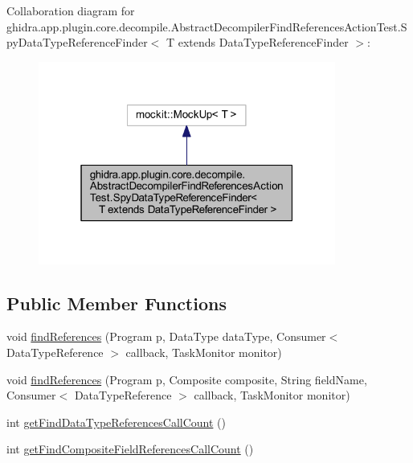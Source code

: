 Collaboration diagram for ghidra.\+app.\+plugin.\+core.\+decompile.\+Abstract\+Decompiler\+Find\+References\+Action\+Test.\+Spy\+Data\+Type\+Reference\+Finder$<$ T extends Data\+Type\+Reference\+Finder $>$\+:
\nopagebreak
\begin{figure}[H]
\begin{center}
\leavevmode
\includegraphics[width=277pt]{classghidra_1_1app_1_1plugin_1_1core_1_1decompile_1_1_abstract_decompiler_find_references_action73cb8965d3052dbece90fcf7f0187236}
\end{center}
\end{figure}
\subsection*{Public Member Functions}
\begin{DoxyCompactItemize}
\item 
void \mbox{\hyperlink{classghidra_1_1app_1_1plugin_1_1core_1_1decompile_1_1_abstract_decompiler_find_references_action62f1da74789936d35e783df474af1e76_a8fa9ec88d0356a00f85d672db38cdb70}{find\+References}} (Program p, Data\+Type data\+Type, Consumer$<$ Data\+Type\+Reference $>$ callback, Task\+Monitor monitor)
\item 
void \mbox{\hyperlink{classghidra_1_1app_1_1plugin_1_1core_1_1decompile_1_1_abstract_decompiler_find_references_action62f1da74789936d35e783df474af1e76_aafec778c5552ffcf7d9a44cf3b7acad1}{find\+References}} (Program p, Composite composite, String field\+Name, Consumer$<$ Data\+Type\+Reference $>$ callback, Task\+Monitor monitor)
\item 
int \mbox{\hyperlink{classghidra_1_1app_1_1plugin_1_1core_1_1decompile_1_1_abstract_decompiler_find_references_action62f1da74789936d35e783df474af1e76_ad645a281a9626bf9c6db823800363505}{get\+Find\+Data\+Type\+References\+Call\+Count}} ()
\item 
int \mbox{\hyperlink{classghidra_1_1app_1_1plugin_1_1core_1_1decompile_1_1_abstract_decompiler_find_references_action62f1da74789936d35e783df474af1e76_a58194323aae0608e642b48bd59db188f}{get\+Find\+Composite\+Field\+References\+Call\+Count}} ()
\end{DoxyCompactItemize}


